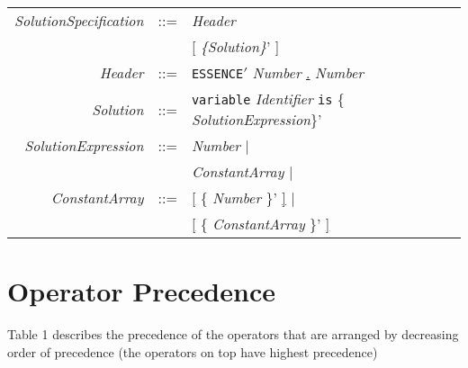 \documentclass{article}
\begin{document}
\begin{tabular}{rcl}
\textit{SolutionSpecification} & ::= & \textit{Header}\\
                               &     & [ \textit{ \{Solution\}}' ] \\

 \textit{Header}& ::= & \texttt{ESSENCE}\underline{$'$} \textit{Number} \underline{.} \textit{Number} \\
 \textit{Solution} & ::=    & \texttt{variable} {\it Identifier} {\tt is} \{ \textit{SolutionExpression}\}' \\
 \textit{SolutionExpression}  & ::=  & \textit{Number} $\mid$ \\
                           & &  \textit{ConstantArray} $\mid$\\


\textit{ConstantArray} & ::= & \underline{[} \{ \textit{Number} \}'  \underline{]} $\mid$ \\
                       &     & \underline{[} \{ \textit{ConstantArray} \}'  \underline{]}  \\


\end{tabular}



\section{Operator Precedence}

Table 1 %
describes the precedence of the operators that 
are arranged by decreasing order of precedence (the operators on top have highest precedence)
\end{document}
